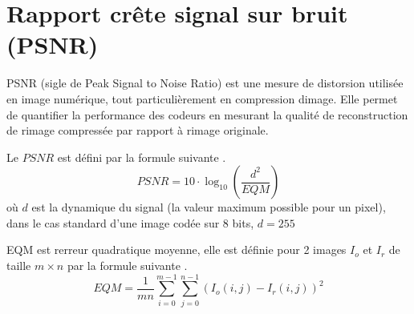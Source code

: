 \documentclass[12pt,a4paper]{report}
\numberwithin{equation}{subsection}
\numberwithin{equation}{section}
\begin{document}
\section{ Rapport crête signal sur bruit (PSNR)}
PSNR (sigle de Peak Signal to Noise Ratio) est une mesure de distorsion utilisée en image numérique, tout particulièrement en compression dimage. Elle permet de quantifier la performance des codeurs en mesurant la qualité de reconstruction de rimage compressée par rapport à rimage originale.

Le $P S N R$ est défini par la formule suivante .
$$
P S N R=10 \cdot \log _{10}\left(\frac{d^{2}}{E Q M}\right)
$$
où $d$ est la dynamique du signal (la valeur maximum possible pour un pixel), dans le cas standard d'une image codée sur 8 bits, $d=255$

EQM est rerreur quadratique moyenne, elle est définie pour 2 images $I_{o}$ et $I_{r}$ de taille $m \times n$ par la formule suivante .
$$
E Q M=\frac{1}{m n} \sum_{i=0}^{m-1} \sum_{j=0}^{n-1}\left(I_{o}(i, j)-I_{r}(i, j)\right)^{2}
$$
\end{document}
